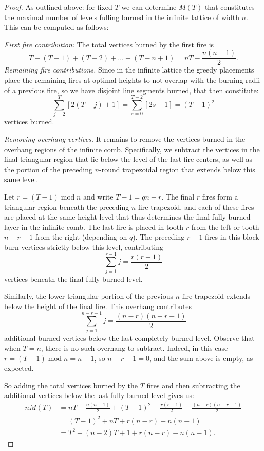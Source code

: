 \documentclass{article}
\def\pmod{\operatorname{mod}}
\begin{document}
\begin{proof}
    As outlined above: for fixed $T$ we can determine $M(T)$ that constitutes the maximal number of levels fulling burned in the infinite lattice of width $n$. This can be computed as follows:

    \medskip
\noindent
\emph{First fire contribution:} The total vertices burned by the first fire is 
    \[
    T + (T-1) + (T-2) + \ldots + (T-n+1) = nT - \frac{n(n-1)}2.\]
    \medskip
    \noindent
    \emph{Remaining fire contributions.} Since in the infinite lattice the greedy placements place the remaining fires at optimal heights to not overlap with the burning radii of a previous fire, so we have disjoint line segments burned, that then constitute:
    \[
    \sum_{j=2}^T[2(T-j) + 1] = \sum_{s=0}^{T-2}[2s+1] = (T-1)^2
    \]
    vertices burned.
    
    \medskip
    \noindent
    \emph{Removing overhang vertices.} It remains to remove the vertices burned in the overhang regions of the infinite comb. 
    Specifically, we subtract the vertices in the final triangular region that lie below the level of the last fire centers, as well as the portion of the preceding $n$-round trapezoidal region that extends below this same level.
    
    Let $r = (T-1) \pmod n$ and write $T-1 = qn + r$. The final $r$ fires form a triangular region beneath the preceding $n$-fire trapezoid, and each of these fires are placed at the same height level that thus determines the final fully burned layer in the infinite comb. The last fire is placed in tooth $r$ from the left or tooth $n-r+1$ from the right (depending on $q$). The preceding $r-1$ fires in this block burn vertices strictly below this level, contributing $$\sum_{j=1}^{r-1} j = \frac{r(r-1)}{2}$$ vertices beneath the final fully burned level.
    
    Similarly, the lower triangular portion of the previous $n$-fire trapezoid extends below the height of the final fire. This overhang contributes $$\sum_{j=1}^{n-r-1} j = \frac{(n-r)(n-r-1)}{2}$$ additional burned vertices below the last completely burned level. Observe that when $T=n$, there is no such overhang to subtract. Indeed, in this case $r=(T-1)\pmod n = n-1$, so $n-r-1=0$, and the sum above is empty, as expected.

    \medskip
    So adding the total vertices burned by the $T$ fires and then subtracting the additional vertices below the last fully burned level gives us:
    \begin{align*}
        nM(T) &= nT - \frac{n(n-1)}2 + (T-1)^2 - \frac{r(r-1)}2 - \frac{(n-r)(n-r-1)}2 \\
        &= (T-1)^2 + nT + r(n-r)-n(n-1)\\
        &= T^2 + (n-2)T + 1 + r(n-r) - n(n-1).
    \end{align*}
\end{proof}
\end{document}
